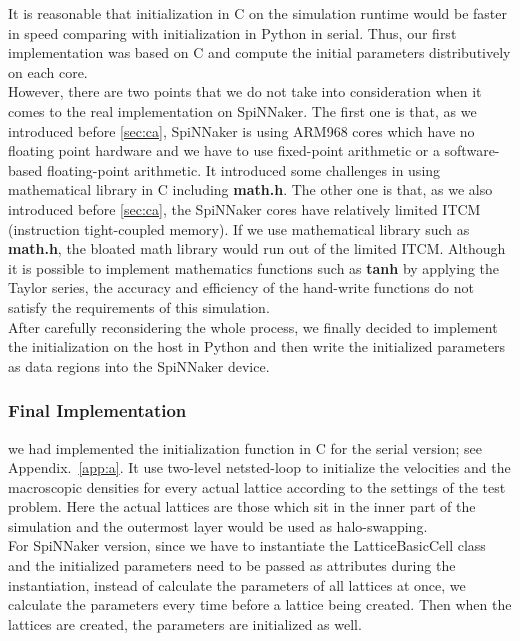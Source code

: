 It is reasonable that initialization in C on the simulation runtime would be faster in speed comparing with initialization in Python in serial. Thus, our first implementation was based on C and compute the initial parameters distributively on each core. \\

However, there are two points that we do not take into consideration when it comes to the real implementation on SpiNNaker. The first one is that, as we introduced before \ref{sec:ca}, SpiNNaker is using ARM968 cores which have no floating point hardware and we have to use fixed-point arithmetic or a software-based floating-point arithmetic. It introduced some challenges in using mathematical library in C including \textbf{math.h}. The other one is that, as we also introduced before \ref{sec:ca}, the SpiNNaker cores have relatively limited ITCM (instruction tight-coupled memory). If we use mathematical library such as \textbf{math.h}, the bloated math library would run out of the limited ITCM. Although it is possible to implement mathematics functions such as \textbf{tanh} by applying the Taylor series, the accuracy and efficiency of the hand-write functions do not satisfy the requirements of this simulation.\\

After carefully reconsidering the whole process, we finally decided to implement the initialization on the host in Python and then write the initialized parameters as data regions into the SpiNNaker device. \\
\subsubsection{Final Implementation}
we had implemented the initialization function in C for the serial version; see Appendix.~\ref{app:a}. It use two-level netsted-loop to initialize the velocities and the macroscopic densities for every actual lattice according to the settings of the test problem. Here the actual lattices are those which sit in the inner part of the simulation and the outermost layer would be used as halo-swapping.\\

For SpiNNaker version, since we have to instantiate the LatticeBasicCell class and the initialized parameters need to be passed as attributes during the instantiation, instead of calculate the parameters of all lattices at once, we calculate the parameters every time before a lattice being created. Then when the lattices are created, the parameters are initialized as well.\\

